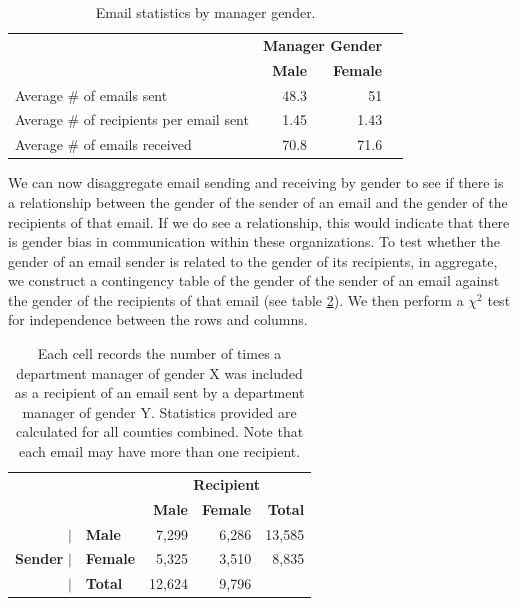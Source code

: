 \documentclass{pnastwo}
\begin{document}
\begin{article}
	\setlength{\tabcolsep}{2pt}
	\begin{table}
	\centering
		\begin{tabular}{m{2.1in}rrr}
		\toprule
		& \multicolumn{2}{c}{\textbf{Manager Gender}} \\
		\cmidrule{2-3}
	& \textbf{Male} & \textbf{Female}  \\
		 \midrule
		 Average \# of emails sent & 48.3 & 51 \\
		 Average \# of recipients per email sent & 1.45 & 1.43 \\
		 \midrule
		 Average \# of emails received & 70.8 & 71.6 \\
		\bottomrule
		\end{tabular}
		\caption{\label{tab:email agg stats}Email statistics by manager
gender.\\}
	\end{table}
	\setlength{\tabcolsep}{6pt}
We can now disaggregate email sending and receiving by gender to see if there is a relationship between the gender of the sender of an email and the gender of the recipients of that email. If we do see a relationship, this would indicate that there is gender bias in communication within these organizations. To test whether the gender of an email sender is related to the gender of its recipients, in aggregate, we construct a contingency table of the gender of the sender of an email against the gender of the recipients of that email (see table \ref{tab:gender email agg stats}). We then perform a $\chi^2$ test for independence between the rows and columns.
	
	\begin{table}
	\centering
		\begin{tabular}{rlrr|r}
		\toprule
		 && \multicolumn{3}{c}{\textbf{Recipient}} \\
		\cmidrule{3-5}
	& & \textbf{Male} & \textbf{Female} & \textbf{Total}  \\
		 \midrule
		$|$& \textbf{Male} & 7,299 & 6,286 & 13,585 \\
	\textbf{Sender}	$|$& \textbf{Female} & 5,325 & 3,510 & 8,835 \\
	\cmidrule{2-5}
		 $|$& \textbf{Total} & 12,624 & 9,796 & \\
		\bottomrule
		\end{tabular}
		\caption{\label{tab:gender email agg stats}Each cell records the number of times a department manager of gender X was included as a recipient of an email sent by a department manager of gender Y. Statistics provided are calculated for all counties combined. Note that each email may have more than one recipient.}
	\end{table}
	

\end{article}
\end{document}
